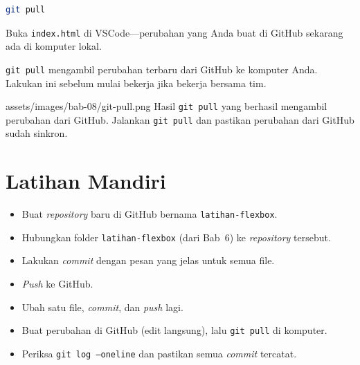 \begin{lstlisting}[language=bash, caption={Pull dari GitHub}, label={lst:git-pull}]
git pull
\end{lstlisting}

\begin{langkah}
  \item Buka \texttt{index.html} di VSCode---perubahan yang Anda buat di GitHub sekarang ada di komputer lokal.
\end{langkah}

\begin{catatan}
\texttt{git pull} mengambil perubahan terbaru dari GitHub ke komputer Anda. Lakukan ini sebelum mulai bekerja jika bekerja bersama tim.
\end{catatan}

\begin{tangkapanlayar}
  {assets/images/bab-08/git-pull.png}
  {Hasil \texttt{git pull} yang berhasil mengambil perubahan dari GitHub.}
  {Jalankan \texttt{git pull} dan pastikan perubahan dari GitHub sudah sinkron.}
\end{tangkapanlayar}

\section{Latihan Mandiri}
\label{sec:git-latihan}

\begin{latihan}
\begin{itemize}
  \item Buat \emph{repository} baru di GitHub bernama \texttt{latihan-flexbox}.
  \item Hubungkan folder \texttt{latihan-flexbox} (dari Bab~6) ke \emph{repository} tersebut.
  \item Lakukan \emph{commit} dengan pesan yang jelas untuk semua file.
  \item \emph{Push} ke GitHub.
  \item Ubah satu file, \emph{commit}, dan \emph{push} lagi.
  \item Buat perubahan di GitHub (edit langsung), lalu \texttt{git pull} di komputer.
  \item Periksa \texttt{git log --oneline} dan pastikan semua \emph{commit} tercatat.
\end{itemize}
\end{latihan}

